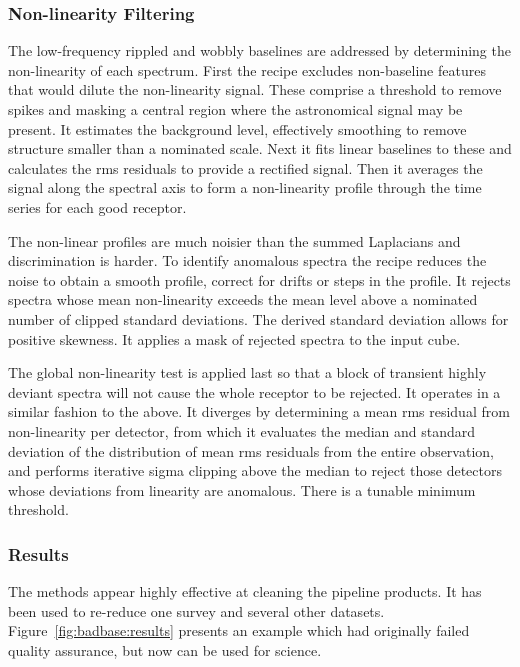 \documentclass[final,authoryear,5p,times,twocolumn]{elsarticle}
\begin{document}
\subsubsection{Non-linearity Filtering}

The low-frequency rippled and wobbly baselines are addressed by
determining the non-linearity of each spectrum.  First the recipe
excludes non-baseline features that would dilute the non-linearity
signal.  These comprise a threshold to remove spikes and masking a
central region where the astronomical signal may be present. It
estimates the background level, effectively smoothing to remove
structure smaller than a nominated scale.  Next it fits linear
baselines to these and calculates the rms residuals to provide a
rectified signal.  Then it averages the signal along the spectral axis
to form a non-linearity profile through the time series for each good
receptor.

The non-linear profiles are much noisier than the summed Laplacians
and discrimination is harder.  To identify anomalous spectra the
recipe reduces the noise to obtain a smooth profile, correct for
drifts or steps in the profile.  It rejects spectra whose mean
non-linearity exceeds the mean level above a nominated number of
clipped standard deviations.  The derived standard deviation allows
for positive skewness.  It applies a mask of rejected spectra to the
input cube.

The global non-linearity test is applied last so that a block of
transient highly deviant spectra will not cause the whole receptor to
be rejected.  It operates in a similar fashion to the above.  It
diverges by determining a mean rms residual from non-linearity per
detector, from which it evaluates the median and standard deviation of
the distribution of mean rms residuals from the entire observation,
and performs iterative sigma clipping above the median to reject those
detectors whose deviations from linearity are anomalous.  There is a
tunable minimum threshold.

\subsubsection{Results}

The methods appear highly effective at cleaning the pipeline
products. It has been used to re-reduce one survey and several other
datasets. Figure~\ref{fig:badbase:results} presents an example which
had originally failed quality assurance, but now can be used for
science.
\end{document}
